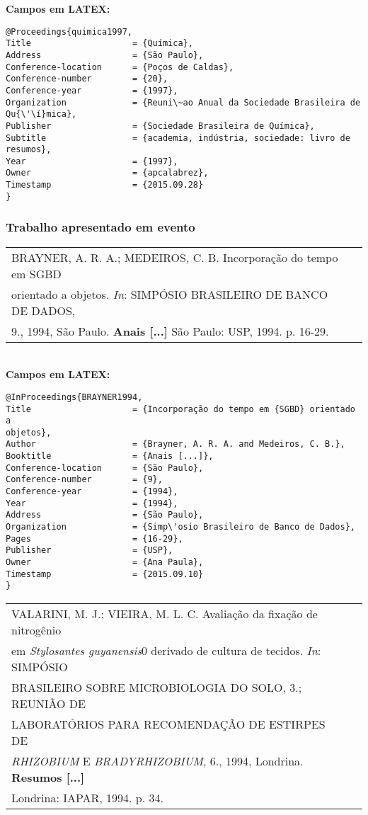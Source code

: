 \textbf{Campos em LATEX:} 

\begin{verbatim}
@Proceedings{quimica1997,
Title                    = {Química},
Address                  = {São Paulo},
Conference-location      = {Poços de Caldas},
Conference-number        = {20},
Conference-year          = {1997},
Organization             = {Reuni\~ao Anual da Sociedade Brasileira de 
Qu{\'\í}mica},
Publisher                = {Sociedade Brasileira de Química},
Subtitle                 = {academia, indústria, sociedade: livro de 
resumos},
Year                     = {1997},
Owner                    = {apcalabrez},
Timestamp                = {2015.09.28}
}
\end{verbatim}

\subsubsection{Trabalho apresentado em evento}

\begin{tabular}{|l|c|} \hline
	BRAYNER, A. R. A.; MEDEIROS, C. B. Incorporação do tempo em SGBD \\orientado a objetos. \textit{In}: SIMPÓSIO BRASILEIRO DE BANCO DE DADOS, \\9., 1994, São Paulo. \textbf{Anais [...]} São Paulo: USP, 1994. p. 16-29.  \\\hline
\end{tabular} \\

\textbf{Campos em LATEX:} 

\begin{verbatim}
@InProceedings{BRAYNER1994,
Title                    = {Incorporação do tempo em {SGBD} orientado a 
objetos},
Author                   = {Brayner, A. R. A. and Medeiros, C. B.},
Booktitle                = {Anais [...]},
Conference-location      = {São Paulo},
Conference-number        = {9},
Conference-year          = {1994},
Year                     = {1994},
Address                  = {São Paulo},
Organization             = {Simp\'osio Brasileiro de Banco de Dados},
Pages                    = {16-29},
Publisher                = {USP},
Owner                    = {Ana Paula},
Timestamp                = {2015.09.10}
}
\end{verbatim}

\begin{tabular}{|l|c|} \hline
	VALARINI, M. J.; VIEIRA, M. L. C. Avaliação da fixação de nitrog\^enio \\ em \textit{Stylosantes guyanensis}0 derivado de cultura de tecidos. \textit{In}: SIMPÓSIO \\ BRASILEIRO SOBRE MICROBIOLOGIA DO SOLO, 3.; REUNIÃO DE \\ LABORATÓRIOS PARA RECOMENDAÇÃO DE ESTIRPES DE \\ \textit{RHIZOBIUM} E \textit{BRADYRHIZOBIUM}, 6., 1994, Londrina. \textbf{Resumos [...]} \\ Londrina: IAPAR, 1994. p. 34. \\\hline
\end{tabular} \\

